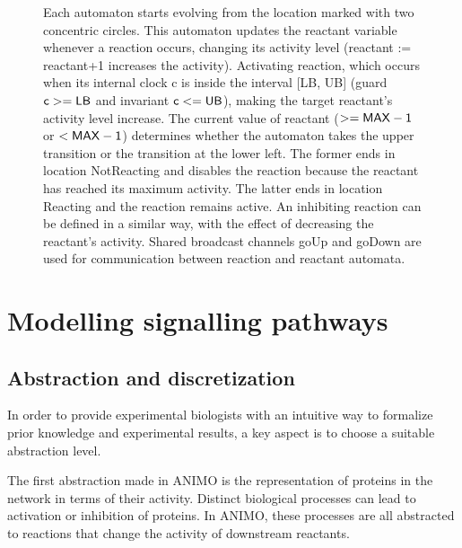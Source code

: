 \documentclass[journal, 10pt]{IEEEtran}
\begin{document}
\begin{figure}[htb]
\begin{center}
{Each automaton starts evolving from the location marked with two concentric circles.
\protect{} This automaton updates the {\sf reactant} variable
whenever a reaction occurs, changing its activity level ({\sf reactant := reactant+1} increases the activity).
\protect{} Activating reaction, which occurs when its internal clock {\sf c}
is inside the interval [{\sf LB, UB}] (guard $\mbox{\sf c} >= \mbox{\sf LB}$ 
and invariant $\mbox{\sf c} <= \mbox{\sf UB}$), making the target reactant's activity level increase. The current value of
{\sf reactant} ($>= \mbox{\sf MAX}-\mbox{\sf 1}$ or $< \mbox{\sf MAX}-\mbox{\sf 1}$)
determines whether the automaton takes the upper transition or the transition at the lower left.
The former ends in location {\sf NotReacting} and disables the reaction because the reactant has reached its maximum activity. The latter ends in 
location {\sf Reacting} and the reaction remains active.
An inhibiting reaction can be defined in a similar way, with the effect of decreasing the reactant's activity.
Shared broadcast channels {\sf goUp} and {\sf goDown} are used for communication between reaction and reactant automata.}
\label{fig:small-example-model}
\end{center}
\end{figure}


\section{Modelling signalling pathways}\label{sec:modeling-signaling-pathways}
\subsection{Abstraction and discretization}\label{sec:abstraction}
In order to provide experimental biologists with an intuitive way to formalize prior knowledge and experimental results,
a key aspect is to choose a suitable abstraction level.


The first abstraction made in ANIMO is the representation of 
proteins in the network in terms of their activity. Distinct biological processes can lead to activation or inhibition of proteins. 
In ANIMO, these processes are all abstracted to reactions that change the activity of downstream reactants. 
\end{document}
